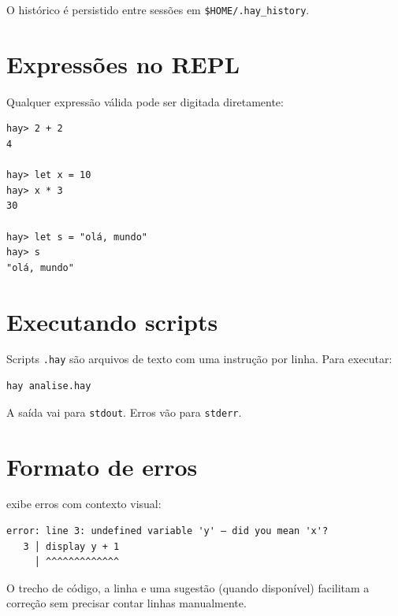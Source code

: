 O histórico é persistido entre sessões em \texttt{\$HOME/.hay\_history}.

\section{Expressões no REPL}

Qualquer expressão válida pode ser digitada diretamente:

\begin{lstlisting}[caption={Sessão interativa básica}]
hay> 2 + 2
4

hay> let x = 10
hay> x * 3
30

hay> let s = "olá, mundo"
hay> s
"olá, mundo"
\end{lstlisting}

\section{Executando scripts}

Scripts \texttt{.hay} são arquivos de texto com uma instrução por linha. Para executar:

\begin{lstlisting}[style=inline, language=sh]
hay analise.hay
\end{lstlisting}

A saída vai para \texttt{stdout}. Erros vão para \texttt{stderr}.

\section{Formato de erros}

\hayashi{} exibe erros com contexto visual:

\begin{lstlisting}[style=inline]
error: line 3: undefined variable 'y' — did you mean 'x'?
   3 │ display y + 1
     │ ^^^^^^^^^^^^^
\end{lstlisting}

O trecho de código, a linha e uma sugestão (quando disponível) facilitam a correção
sem precisar contar linhas manualmente.
